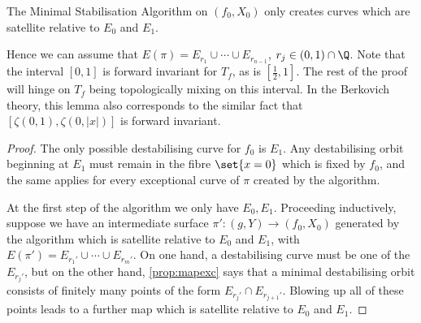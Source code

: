 \documentclass[11pt, final]{amsart}
\newcommand{\minimalalgname}{Minimal Stabilisation Algorithm}
\newcommand{\half}{\frac 12}
\begin{document}
\begin{lem}\label{lem:satellitestab}
 The \minimalalgname{} on $(f_0, X_0)$ only creates curves which are satellite relative to $E_0$ and $E_1$.
\end{lem}

Hence we can assume that $E(\pi) = E_{r_1} \cup \cdots \cup E_{r_{n-1}}$, $r_j \in (0, 1) \cap \Q$. Note that the interval $[0, 1]$ is forward invariant for $T_f$, as is $[\half, 1]$. The rest of the proof will hinge on $T_f$ being topologically mixing on this interval. In the Berkovich theory, this lemma also corresponds to the similar fact that $[\zeta(0, 1), \zeta(0, |x|)]$ is forward invariant.

\begin{proof}
The only possible destabilising curve for $f_0$ is $E_1$. Any destabilising orbit beginning at $E_1$ must remain in the fibre $\set{x=0}$ which is fixed by $f_0$, and the same applies for every exceptional curve of $\pi$ created by the algorithm.

 At the first step of the algorithm we only have $E_0, E_1$. %
 Proceeding inductively, suppose we have an intermediate surface $\pi' : (g, Y) \to (f_0, X_0)$ generated by the algorithm which is satellite relative to $E_0$ and $E_1$, with $E(\pi') = E_{r_1'} \cup \cdots \cup E_{r_m'}$. 
 On one hand, a destabilising curve must be one of the $E_{r_j'}$, but on the other hand, \autoref{prop:mapexc} says that a minimal destabilising orbit consists of finitely many points of the form $E_{r_j'}\cap E_{r_{j+1}'}$. Blowing up all of these points leads to a further map which is satellite relative to $E_0$ and $E_1$.
\end{proof}
\end{document}
